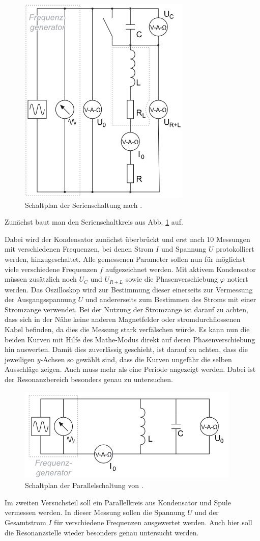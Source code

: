 \documentclass[12pt,a4paper,titlepage,headinclude,bibtotoc]{scrartcl}
\begin{document}
\begin{figure}[!h]
\centering
\includegraphics[width=0.5\linewidth]{serie}
\caption{Schaltplan der Serienschaltung nach \cite[4.10.2014, 15:30]{LP14}.}
\label{fig:serienschaltung}
\end{figure}
Zunächst baut man den Serienschaltkreis aus Abb. \ref{fig:serienschaltung} auf.

Dabei wird der Kondensator zunächst überbrückt und erst nach 10 Messungen mit verschiedenen Frequenzen, bei denen Strom $I$ und Spannung $U$ protokolliert werden, hinzugeschaltet.
Alle gemessenen Parameter sollen nun für möglichst viele verschiedene Frequenzen $f$ aufgezeichnet werden.
Mit aktivem Kondensator müssen zusätzlich noch $U_C$ und $U_{R+L}$ sowie die Phasenverschiebung $\varphi$ notiert werden.
Das Oszilloskop wird zur Bestimmung dieser einerseits zur Vermessung der Ausgangsspannung $U$ und andererseits zum Bestimmen des Stroms mit einer Stromzange verwendet.
Bei der Nutzung der Stromzange ist darauf zu achten, dass sich in der Nähe keine anderen Magnetfelder oder stromdurchflossenen Kabel befinden, da dies die Messung stark verfälschen würde.
Es kann nun die beiden Kurven mit Hilfe des Mathe-Modus direkt auf deren Phasenverschiebung hin auswerten.
Damit dies zuverlässig geschieht, ist darauf zu achten, dass die jeweiligen $y$-Achsen so gewählt sind, dass die Kurven ungefähr die selben Ausschläge zeigen.
Auch muss mehr als eine Periode angezeigt werden.
Dabei ist der Resonanzbereich besonders genau zu untersuchen.\\

\begin{figure}[!h]
\centering
\includegraphics[width=0.6\linewidth]{parallel}
\caption{Schaltplan der Parallelschaltung von \cite[4.10.2014, 15:30]{LP14}.}
\label{fig:parallel}
\end{figure}
Im zweiten Versuchsteil soll ein Parallelkreis aus Kondensator und Spule vermessen werden.
In dieser Messung sollen die Spannung $U$ und der Gesamtstrom $I$ für verschiedene Frequenzen ausgewertet werden.
Auch hier soll die Resonanzstelle wieder besonders genau untersucht werden.\\
\end{document}
